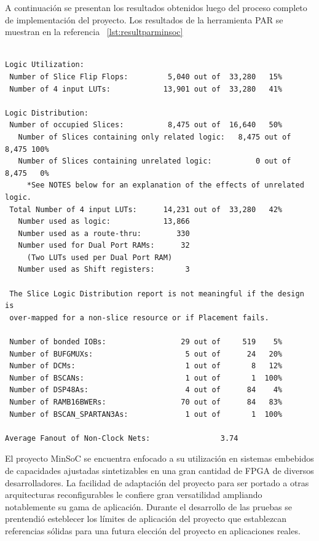 	A continuación se presentan los resultados obtenidos luego del proceso completo de implementación del proyecto.  Los resultados de la herramienta PAR
	se muestran en la referencia ~\ref{lst:resultparminsoc}

\begin{lstlisting}[frame=single,caption={Resumen de utilización - MinSoC},label={lst:resultparminsoc},breaklines]

Logic Utilization:
 Number of Slice Flip Flops:         5,040 out of  33,280   15%
 Number of 4 input LUTs:            13,901 out of  33,280   41%

Logic Distribution:
 Number of occupied Slices:          8,475 out of  16,640   50%
   Number of Slices containing only related logic:   8,475 out of   8,475 100%
   Number of Slices containing unrelated logic:          0 out of   8,475   0%
     *See NOTES below for an explanation of the effects of unrelated logic.
 Total Number of 4 input LUTs:      14,231 out of  33,280   42%
   Number used as logic:            13,866
   Number used as a route-thru:        330
   Number used for Dual Port RAMs:      32
     (Two LUTs used per Dual Port RAM)
   Number used as Shift registers:       3

 The Slice Logic Distribution report is not meaningful if the design is
 over-mapped for a non-slice resource or if Placement fails.

 Number of bonded IOBs:                 29 out of     519    5%
 Number of BUFGMUXs:                     5 out of      24   20%
 Number of DCMs:                         1 out of       8   12%
 Number of BSCANs:                       1 out of       1  100%
 Number of DSP48As:                      4 out of      84    4%
 Number of RAMB16BWERs:                 70 out of      84   83%
 Number of BSCAN_SPARTAN3As:             1 out of       1  100%

Average Fanout of Non-Clock Nets:                3.74

\end{lstlisting}

	El proyecto MinSoC se encuentra enfocado a su utilización en sistemas embebidos de capacidades ajustadas sintetizables en una gran cantidad de FPGA
	de diversos desarrolladores. La facilidad de adaptación del proyecto para ser portado a otras arquitecturas reconfigurables le confiere gran
	versatilidad ampliando notablemente su gama de aplicación.
	Durante el desarrollo de las pruebas se prentendió esteblecer los límites de aplicación del proyecto que establezcan referencias sólidas para una
	futura elección del proyecto en aplicaciones reales.

